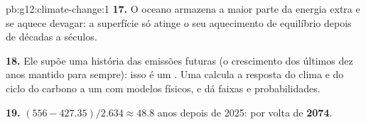 \begin{solution}{pb:g12:climate-change:1}
\textbf{17.} O oceano armazena a maior parte da energia extra e se aquece
devagar: a superfície só atinge o seu aquecimento de equilíbrio depois de
décadas a séculos.

\textbf{18.} Ele supõe uma história das emissões futuras (o crescimento dos
últimos dez anos mantido para sempre): isso é um . Uma 
calcula a resposta do clima e do ciclo do carbono a um 
com modelos físicos, e dá faixas e probabilidades.

\textbf{19.} $(556 - 427.35)/2.634 \approx 48.8$ anos depois de 2025: por
volta de \textbf{2074}.
\end{solution}
